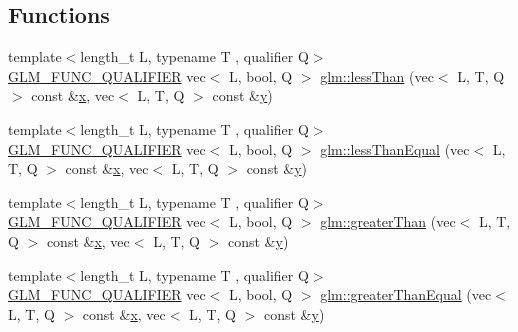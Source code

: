 \subsection*{Functions}
\begin{DoxyCompactItemize}
\item 
{\footnotesize template$<$length\+\_\+t L, typename T , qualifier Q$>$ }\\\hyperlink{setup_8hpp_a33fdea6f91c5f834105f7415e2a64407}{G\+L\+M\+\_\+\+F\+U\+N\+C\+\_\+\+Q\+U\+A\+L\+I\+F\+I\+ER} vec$<$ L, bool, Q $>$ \hyperlink{group__core__func__vector__relational_ga314be073c42278ccb6fe7a7958213824}{glm\+::less\+Than} (vec$<$ L, T, Q $>$ const \&\hyperlink{_s_d_l__opengl_8h_ad0e63d0edcdbd3d79554076bf309fd47}{x}, vec$<$ L, T, Q $>$ const \&\hyperlink{_s_d_l__opengl_8h_a1675d9d7bb68e1657ff028643b4037e3}{y})
\item 
{\footnotesize template$<$length\+\_\+t L, typename T , qualifier Q$>$ }\\\hyperlink{setup_8hpp_a33fdea6f91c5f834105f7415e2a64407}{G\+L\+M\+\_\+\+F\+U\+N\+C\+\_\+\+Q\+U\+A\+L\+I\+F\+I\+ER} vec$<$ L, bool, Q $>$ \hyperlink{group__core__func__vector__relational_ga51bf75522dbe1fa5e7806eb9b825ab6a}{glm\+::less\+Than\+Equal} (vec$<$ L, T, Q $>$ const \&\hyperlink{_s_d_l__opengl_8h_ad0e63d0edcdbd3d79554076bf309fd47}{x}, vec$<$ L, T, Q $>$ const \&\hyperlink{_s_d_l__opengl_8h_a1675d9d7bb68e1657ff028643b4037e3}{y})
\item 
{\footnotesize template$<$length\+\_\+t L, typename T , qualifier Q$>$ }\\\hyperlink{setup_8hpp_a33fdea6f91c5f834105f7415e2a64407}{G\+L\+M\+\_\+\+F\+U\+N\+C\+\_\+\+Q\+U\+A\+L\+I\+F\+I\+ER} vec$<$ L, bool, Q $>$ \hyperlink{group__core__func__vector__relational_gad3a3a7d228da3754c328c9a778f6df56}{glm\+::greater\+Than} (vec$<$ L, T, Q $>$ const \&\hyperlink{_s_d_l__opengl_8h_ad0e63d0edcdbd3d79554076bf309fd47}{x}, vec$<$ L, T, Q $>$ const \&\hyperlink{_s_d_l__opengl_8h_a1675d9d7bb68e1657ff028643b4037e3}{y})
\item 
{\footnotesize template$<$length\+\_\+t L, typename T , qualifier Q$>$ }\\\hyperlink{setup_8hpp_a33fdea6f91c5f834105f7415e2a64407}{G\+L\+M\+\_\+\+F\+U\+N\+C\+\_\+\+Q\+U\+A\+L\+I\+F\+I\+ER} vec$<$ L, bool, Q $>$ \hyperlink{group__core__func__vector__relational_ga271038c5290184127754bda0ae91a5bd}{glm\+::greater\+Than\+Equal} (vec$<$ L, T, Q $>$ const \&\hyperlink{_s_d_l__opengl_8h_ad0e63d0edcdbd3d79554076bf309fd47}{x}, vec$<$ L, T, Q $>$ const \&\hyperlink{_s_d_l__opengl_8h_a1675d9d7bb68e1657ff028643b4037e3}{y})

\end{DoxyCompactItemize}
